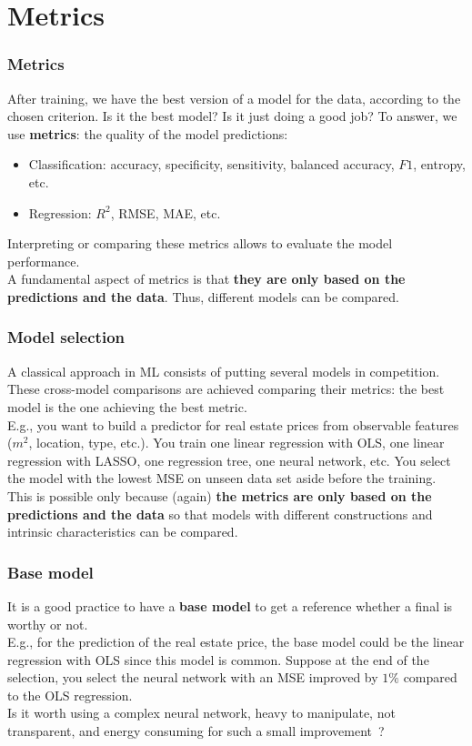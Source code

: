 \section{Metrics}
\begin{frame}
\frametitle{Metrics}
After training, we have the best version of a model for the data, according to the chosen criterion. Is it the best model? Is it just doing a good job? To answer, we use {\bf metrics}: the quality of the model predictions: 
\begin{itemize}
\item Classification: accuracy, specificity, sensitivity, balanced accuracy, $F1$, entropy, etc.
\item Regression: $R^2$, RMSE, MAE, etc.
\end{itemize}
Interpreting or comparing these metrics allows to evaluate the model performance.\\
\vspace{0.3cm}
A fundamental aspect of metrics is that {\bf they are only based on the predictions and the data}. Thus, different models can be compared.
\end{frame}
\begin{frame}
\frametitle{Model selection}
A classical approach in ML consists of putting several models in competition. These cross-model comparisons are achieved comparing their metrics: the best model is the one achieving the best metric.\\
\vspace{0.3cm}
E.g., you want to build a predictor for real estate prices from observable features ($m^2$, location, type, etc.). You train one linear regression with OLS, one linear regression with LASSO, one regression tree, one neural network, etc. You select the model with the lowest MSE on unseen data set aside before the training. \\
\vspace{0.3cm}
This is possible only because (again) {\bf the metrics are only based on the predictions and the data} so that models with different constructions and intrinsic characteristics can be compared. 
\end{frame}
\begin{frame}
\frametitle{Base model}
It is a good practice to have a {\bf base model} to get a reference whether a final is worthy or not.\\
\vspace{0.3cm} 
E.g., for the prediction of the real estate price, the base model could be the linear regression with OLS since this model is common. Suppose at the end of the selection, you select the neural network with an MSE improved by $1\%$ compared to the OLS regression.\\ 
\vspace{0.3cm}
Is it worth using a complex neural network, heavy to manipulate, not transparent, and energy consuming for such a small improvement~?
\end{frame}
